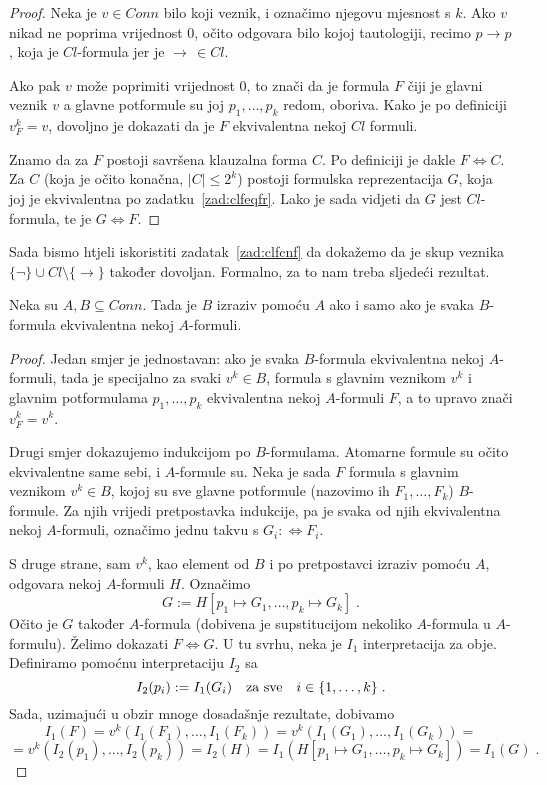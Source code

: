 \begin{proof}
Neka je $v\in Conn$ bilo koji veznik, i označimo njegovu mjesnost s $k$. Ako $v$ nikad ne poprima vrijednost $0$, očito odgovara bilo kojoj tautologiji, recimo $p\to p$, koja je $Cl$-formula jer je $\to\,\in Cl$.

Ako pak $v$ može poprimiti vrijednost $0$, to znači da je formula $F$ čiji je glavni veznik $v$ a glavne potformule su joj $p_1,\ldots,p_k$ redom, oboriva. Kako je po definiciji $v^k_F=v$, dovoljno je dokazati da je $F$ ekvivalentna nekoj $Cl$ formuli.

Znamo da za $F$ postoji savršena klauzalna forma $C$. Po definiciji je dakle $F\Leftrightarrow C$. Za $C$ (koja je očito konačna, $\left|C\right|\le 2^k$) postoji formulska reprezentacija $G$, koja joj je ekvivalentna po zadatku~\ref{zad:clfeqfr}. Lako je sada vidjeti da $G$ jest $Cl$-formula, te je $G\Leftrightarrow F$.
\end{proof}

Sada bismo htjeli iskoristiti zadatak~\ref{zad:clfcnf} da dokažemo da je skup veznika $\{\neg\}\cup Cl\setminus\{\to\}$ također dovoljan. Formalno, za to nam treba sljedeći rezultat.

\begin{teorem}
	Neka su $A, B\subseteq Conn$. Tada je $B$ izraziv pomoću $A$ ako i samo ako je svaka $B$-formula ekvivalentna nekoj $A$-formuli.
\end{teorem}

\begin{proof}
	Jedan smjer je jednostavan: ako je svaka $B$-formula ekvivalentna nekoj $A$-formuli, tada je specijalno za svaki $v^k\in B$, formula s glavnim veznikom $v^k$ i glavnim potformulama $p_1,\ldots,p_k$ ekvivalentna nekoj $A$-formuli $F$, a to upravo znači $v^k_F=v^k$.
	
	Drugi smjer dokazujemo indukcijom po $B$-formulama. Atomarne formule su očito ekvivalentne same sebi, i $A$-formule su. Neka je sada $F$ formula s glavnim veznikom $v^k\in B$, kojoj su sve glavne potformule (nazovimo ih $F_1,\ldots,F_k$) $B$-formule. Za njih vrijedi pretpostavka indukcije, pa je svaka od njih ekvivalentna nekoj $A$-formuli, označimo jednu takvu s $G_i:\Leftrightarrow F_i$.
	
	S druge strane, sam $v^k$, kao element od $B$ i po pretpostavci izraziv pomoću $A$, odgovara nekoj $A$-formuli $H$. Označimo $$G:=H[p_1\mapsto G_1,\ldots,p_k\mapsto G_k]\;.$$
	Očito je $G$ također $A$-formula (dobivena je supstitucijom nekoliko $A$-formula u $A$-formulu). Želimo dokazati $F\Leftrightarrow G$. U tu svrhu, neka je $I_1$ interpretacija za obje. Definiramo pomoćnu interpretaciju $I_2$ sa
	$$I_2(p_i):=I_1(G_i)\mbox{\quad za sve\quad}i\in\{1,\ldots,k\}\;.$$
	Sada, uzimajući u obzir mnoge dosadašnje rezultate, dobivamo
	$$I_1(F)=v^k(I_1(F_1),\ldots,I_1(F_k))=v^k(I_1(G_1),\ldots,I_1(G_k))=$$
	$$=v^k(I_2(p_1),\ldots,I_2(p_k))=I_2(H)=I_1(H[p_1\mapsto G_1,\ldots,p_k\mapsto G_k])=I_1(G)\;.$$
\end{proof}

